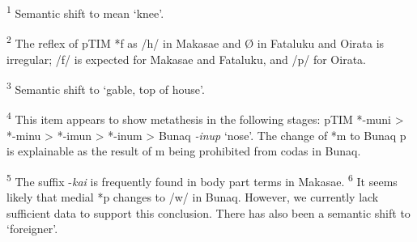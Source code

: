 \textsuperscript{1} Semantic shift to mean `knee'.  

\textsuperscript{2} The reflex of pTIM *f as /h/ in Makasae and {\O} in Fataluku and Oirata is irregular; /f/ is expected for Makasae and Fataluku, and /p/ for Oirata.  

\textsuperscript{3} Semantic shift to `gable, top of house'.  

\textsuperscript{4} This item appears to show metathesis in the following stages: pTIM *-muni {\textgreater} *-minu {\textgreater} *-imun {\textgreater} *-inum {\textgreater} Bunaq \textit{{}-inup} `nose'. The change of *m to Bunaq p is explainable as the result of m being prohibited from codas in Bunaq.  

\textsuperscript{5} The suffix -\textit{kai} is frequently found in body part terms in Makasae. 
 \textsuperscript{6} It seems likely that medial *p changes to /w/ in Bunaq. However, we currently lack sufficient data to support this conclusion. There has also been a semantic shift to `foreigner'.


